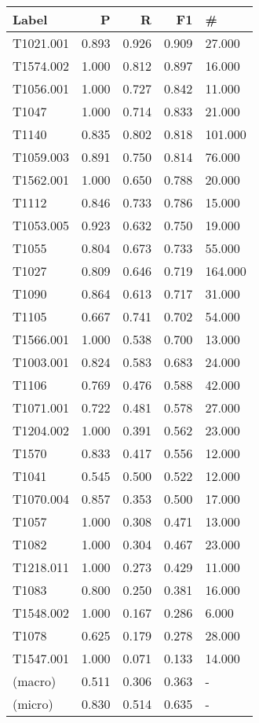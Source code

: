 \begin{tabular}{lrrrl}
    \toprule
    Label     & P     & R     & F1    & \#      \\
    \midrule
    T1021.001 & 0.893 & 0.926 & 0.909 & 27.000  \\
    T1574.002 & 1.000 & 0.812 & 0.897 & 16.000  \\
    T1056.001 & 1.000 & 0.727 & 0.842 & 11.000  \\
    T1047     & 1.000 & 0.714 & 0.833 & 21.000  \\
    T1140     & 0.835 & 0.802 & 0.818 & 101.000 \\
    T1059.003 & 0.891 & 0.750 & 0.814 & 76.000  \\
    T1562.001 & 1.000 & 0.650 & 0.788 & 20.000  \\
    T1112     & 0.846 & 0.733 & 0.786 & 15.000  \\
    T1053.005 & 0.923 & 0.632 & 0.750 & 19.000  \\
    T1055     & 0.804 & 0.673 & 0.733 & 55.000  \\
    T1027     & 0.809 & 0.646 & 0.719 & 164.000 \\
    T1090     & 0.864 & 0.613 & 0.717 & 31.000  \\
    T1105     & 0.667 & 0.741 & 0.702 & 54.000  \\
    T1566.001 & 1.000 & 0.538 & 0.700 & 13.000  \\
    T1003.001 & 0.824 & 0.583 & 0.683 & 24.000  \\
    T1106     & 0.769 & 0.476 & 0.588 & 42.000  \\
    T1071.001 & 0.722 & 0.481 & 0.578 & 27.000  \\
    T1204.002 & 1.000 & 0.391 & 0.562 & 23.000  \\
    T1570     & 0.833 & 0.417 & 0.556 & 12.000  \\
    T1041     & 0.545 & 0.500 & 0.522 & 12.000  \\
    T1070.004 & 0.857 & 0.353 & 0.500 & 17.000  \\
    T1057     & 1.000 & 0.308 & 0.471 & 13.000  \\
    T1082     & 1.000 & 0.304 & 0.467 & 23.000  \\
    T1218.011 & 1.000 & 0.273 & 0.429 & 11.000  \\
    T1083     & 0.800 & 0.250 & 0.381 & 16.000  \\
    T1548.002 & 1.000 & 0.167 & 0.286 & 6.000   \\
    T1078     & 0.625 & 0.179 & 0.278 & 28.000  \\
    T1547.001 & 1.000 & 0.071 & 0.133 & 14.000 \\
    (macro)   & 0.511 & 0.306 & 0.363 & - \\
    (micro)   & 0.830 & 0.514 & 0.635 & -       \\
    \bottomrule
\end{tabular}
